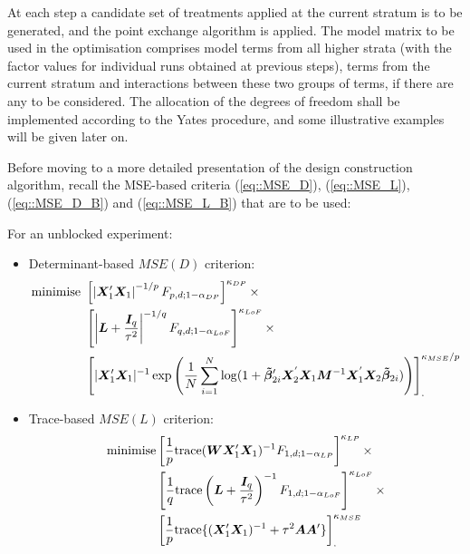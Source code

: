 At each step a candidate set of treatments applied at the current stratum is to be generated, and the point exchange algorithm is applied. The model matrix to be used in the optimisation comprises model terms from all higher strata (with the factor values for individual runs obtained at previous steps), terms from the current stratum and interactions between these two groups of terms, if there are any to be considered. The allocation of the degrees of freedom shall be implemented according to the Yates procedure, and some illustrative examples will be given later on.

Before moving to a more detailed presentation of the design construction algorithm, recall the MSE-based criteria (\ref{eq::MSE_D}), (\ref{eq::MSE_L}), (\ref{eq::MSE_D_B}) and (\ref{eq::MSE_L_B}) that are to be used:

For an unblocked experiment:
\begin{itemize}
\item Determinant-based $MSE(D)$ criterion:
\begin{align}
\label{eq::MSE_D_ms}
\mbox{minimise }&\left[\left|\bm{X}'_{1}\bm{X}_{1}\right|^{-1/p}F_{p,d;1-\alpha_{DP}}\right]^{\kappa_{DP}} \times \notag \\ &\left[\left|\bm{L}+\frac{\bm{I}_{q}}{\tau^{2}}\right|^{-1/q}F_{q,d;1-\alpha_{LoF}}\right]^{\kappa_{LoF}}\times \notag\\ & \left[|\bm{X}'_{1}\bm{X}_{1}|^{-1}\exp\left(\frac{1}{N}\sum_{i=1}^{N}\log(1+\bm{\tilde{\beta}}_{2i}'\bm{X}_2^{'}\bm{X}_1\bm{M}^{-1}\bm{X}_1^{'}\bm{X}_2\bm{\tilde{\beta}}_{2i})\right)\right]_{.}^{\kappa_{MSE}/p}
\end{align}
\item Trace-based $MSE(L)$ criterion:
\begin{align}
\label{eq::MSE_L_ms}
\mbox{minimise} &\left[\frac{1}{p}\mbox{trace}(\bm{WX}'_{1}\bm{X}_{1})^{-1}F_{1,d;1-\alpha_{LP}}\right]^{\kappa_{LP}}\times \notag\\& \left[\frac{1}{q}\mbox{trace}\left(\bm{L}+\frac{\bm{I}_{q}}{\tau^{2}}\right)^{-1}F_{1,d;1-\alpha_{LoF}}\right]^{\kappa_{LoF}}\times 
\notag\\& \left[\frac{1}{p}\mbox{trace}\{(\bm{X}'_{1}\bm{X}_{1})^{-1}+\tau^2\bm{A}\bm{A}'\}\right]^{\kappa_{MSE}}_{.}
\end{align}
\end{itemize} 
 
